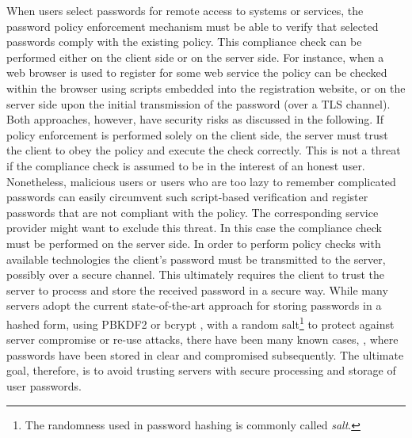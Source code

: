 When users select passwords for remote access to systems or services, the password policy enforcement mechanism must be able to verify that selected passwords comply with the existing policy.
This compliance check can be performed either on the client side or on the server side.
For instance, when a web browser is used to register for some web service the policy can be checked within the browser using scripts embedded into the registration website, or on the server side upon the initial transmission of the password (\eg over a \ac{TLS} channel).
Both approaches, however, have security risks as discussed in the following.
If policy enforcement is performed solely on the client side, the server must trust the client to obey the policy and execute the check correctly.
This is not a threat if the compliance check is assumed to be in the interest of an honest user.
Nonetheless, malicious users or users who are too lazy to remember complicated passwords can easily circumvent such script-based verification and register passwords that are not compliant with the policy. The corresponding service provider might want to exclude this threat.
In this case the compliance check must be performed on the server side.
In order to perform policy checks with available technologies the client's password must be transmitted to the server, possibly over a secure channel.
This ultimately requires the client to trust the server to process and store the received password in a secure way.
While many servers adopt the current state-of-the-art approach for storing passwords in a hashed form, \eg using PBKDF2 \cite{rfc2898,nist800} or bcrypt \cite{ProvosM99}, with a random salt\footnote{The randomness used in password hashing is commonly called \emph{salt}.} to protect against server compromise or re-use attacks, there have been many known cases, \eg \cite{rockyouBreach,msBreach,cupidBreach}, where passwords have been stored in clear and compromised subsequently.
The ultimate goal, therefore, is to avoid trusting servers with secure processing and storage of user passwords.
